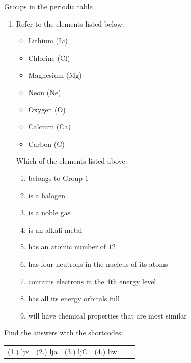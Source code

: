 \begin{exercises}{Groups in the periodic table}
\begin{enumerate}[noitemsep, label=\textbf{\arabic*}. ]
\item            \label{m38760*id262476}Refer to the elements listed below: \label{m38760*id7632}\begin{itemize}[noitemsep]
            \item Lithium ($\mathrm{Li}$)\item Chlorine ($\mathrm{Cl}$)\item Magnesium ($\mathrm{Mg}$)\item Neon ($\mathrm{Ne}$)\item Oxygen ($\mathrm{O}$)\item Calcium ($\mathrm{Ca}$)\item Carbon ($\mathrm{C}$)\end{itemize}
         Which of the elements listed above:
        \label{m38760*id262499}\begin{enumerate}[noitemsep, label=\textbf{\alph*}. ] 
            \label{m38760*uid158}\item belongs to Group $1$
\label{m38760*uid159}\item is a halogen
\label{m38760*uid160}\item is a noble gas
\label{m38760*uid161}\item is an alkali metal
\label{m38760*uid162}\item has an atomic number of $12$
\label{m38760*uid163}\item has four neutrons in the nucleus of its atoms
\label{m38760*uid164}\item contains electrons in the 4th energy level
\label{m38760*uid166}\item has all its energy orbitals full
\label{m38760*uid167}\item will have chemical properties that are most similar
\end{enumerate}
\end{enumerate}
         \par 
\label{m38760**end}
\practiceinfo
\par {} Find the answers with the shortcodes:
 \par \begin{tabular}[h]{cccccc}
 (1.) ljx  & (2.) lja & (3.) ljC & (4.) liw \end{tabular}

\end{exercises}
